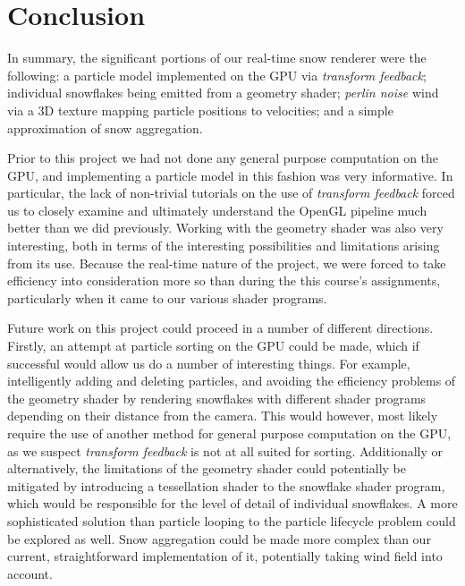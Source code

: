 \documentclass[conference]{acmsiggraph}
\begin{document}
\section{Conclusion}
In summary, the significant portions of our real-time snow renderer were the following: a particle model implemented on the GPU via \textit{transform feedback}; individual snowflakes being emitted from a geometry shader; \textit{perlin noise} wind via a 3D texture mapping particle positions to velocities; and a simple approximation of snow aggregation.

Prior to this project we had not done any general purpose computation on the GPU, and implementing a particle model in this fashion was very informative. In particular, the lack of non-trivial tutorials on the use of \textit{transform feedback} forced us to closely examine and ultimately understand the OpenGL pipeline much better than we did previously. Working with the geometry shader was also very interesting, both in terms of the interesting possibilities and limitations arising from its use. Because the real-time nature of the project, we were forced to take efficiency into consideration more so than during the this course's assignments, particularly when it came to our various shader programs.

Future work on this project could proceed in a number of different directions. Firstly, an attempt at particle sorting on the GPU could be made, which if successful would allow us do a number of interesting things. For example, intelligently adding and deleting particles, and avoiding the efficiency problems of the geometry shader by rendering snowflakes with different shader programs depending on their distance from the camera. This would however, most likely require the use of another method for general purpose computation on the GPU, as we suspect \textit{transform feedback} is not at all suited for sorting. Additionally or alternatively, the limitations of the geometry shader could potentially be mitigated by introducing a tessellation shader to the snowflake shader program, which would be responsible for the level of detail of individual snowflakes. A more sophisticated solution than particle looping to the particle lifecycle problem could be explored as well. Snow aggregation could be made more complex than our current, straightforward implementation of it, potentially taking wind field into account.


\nocite{*}

\end{document}
